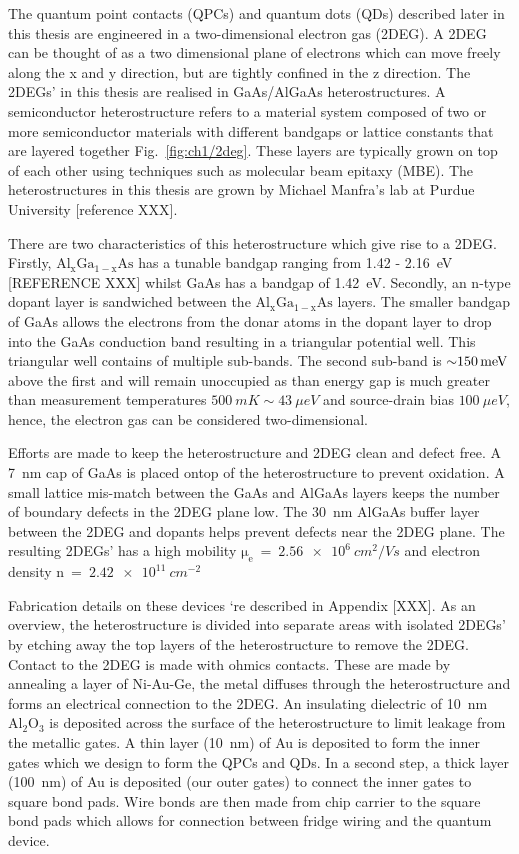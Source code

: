 The quantum point contacts (QPCs) and quantum dots (QDs) described later in this thesis are engineered in a two-dimensional electron gas (2DEG). A 2DEG can be thought of as a two dimensional plane of electrons which can move freely along the x and y direction, but are tightly confined in the z direction. The 2DEGs' in this thesis are realised in GaAs/AlGaAs heterostructures. A semiconductor heterostructure refers to a material system composed of two or more semiconductor materials with different bandgaps or lattice constants that are layered together Fig.~\ref{fig:ch1/2deg}. These layers are typically grown on top of each other using techniques such as molecular beam epitaxy (MBE). The heterostructures in this thesis are grown by Michael Manfra's lab at Purdue University [reference XXX]. 

There are two characteristics of this heterostructure which give rise to a 2DEG. Firstly, $\mathrm{Al_xGa_{1-x}As}$ has a tunable bandgap ranging from 1.42 - \qty{2.16}{eV} [REFERENCE XXX] whilst GaAs has a bandgap of \qty{1.42}{eV}. Secondly, an n-type dopant layer is sandwiched between the $\mathrm{Al_xGa_{1-x}As}$ layers. The smaller bandgap of GaAs allows the electrons from the donar atoms in the dopant layer to drop into the GaAs conduction band resulting in a triangular potential well. This triangular well contains of multiple sub-bands. The second sub-band is $\qty{\sim 150}{meV}$ above the first and will remain unoccupied as than energy gap is much greater than measurement temperatures $\qty{500}{mK}\sim\qty{43}{\mu eV}$ and source-drain bias $\qty{100}{\mu eV}$, hence, the electron gas can be considered two-dimensional.

Efforts are made to keep the heterostructure and 2DEG clean and defect free. A \qty{7}{nm} cap of GaAs is placed ontop of the heterostructure to prevent oxidation. A small lattice mis-match between the GaAs and AlGaAs layers keeps the number of boundary defects in the 2DEG plane low. The \qty{30}{nm} AlGaAs buffer layer between the 2DEG and dopants helps prevent defects near the 2DEG plane. The resulting 2DEGs' has a high mobility $\mathrm{\mu_e}~=~\qty{2.56e6}{cm^2/Vs}$ and electron density $\mathrm{n}~=~\qty{2.42e11}{cm^{-2}}$

Fabrication details on these devices `re described in Appendix [XXX]. As an overview, the heterostructure is divided into separate areas with isolated 2DEGs' by etching away the top layers of the heterostructure to remove the 2DEG. Contact to the 2DEG is made with ohmics contacts. These are made by annealing a layer of Ni-Au-Ge, the metal diffuses through the heterostructure and forms an electrical connection to the 2DEG. An insulating dielectric of \qty{10}{nm} $\mathrm{Al_2O_3}$ is deposited across the surface of the heterostructure to limit leakage from the metallic gates.  A thin layer (\qty{10}{nm}) of Au is deposited to form the inner gates which we design to form the QPCs and QDs. In a second step, a thick layer (\qty{100}{nm}) of Au is deposited (our outer gates) to connect the inner gates to square bond pads. Wire bonds are then made from chip carrier to the square bond pads which allows for connection between fridge wiring and the quantum device. 

